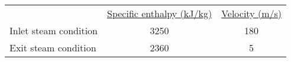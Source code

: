 \begin{tabular}{lcc}
 & \underline{Specific enthalpy (kJ/kg)} & \underline{Velocity (m/s)} \\

Inlet steam condition & 3250 & 180 \\
Exit steam condition  & 2360 & 5 \\
\end{tabular}

